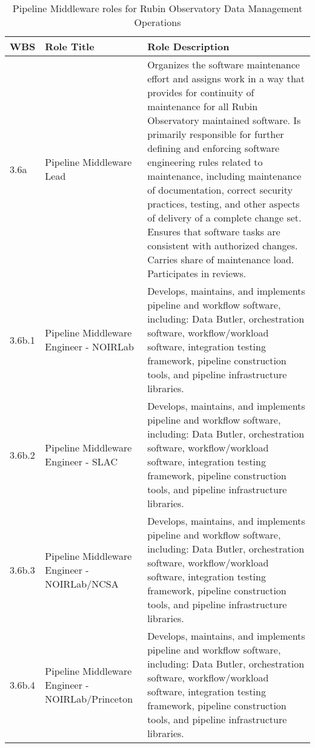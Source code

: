\normalsize \begin{longtable} {|p{}|p{}|p{}|} \caption{Pipeline Middleware roles for Rubin Observatory Data Management Operations \label{tab:pmwroles}}\\ 
\hline 
\textbf{WBS}&\textbf{Role Title}&\textbf{Role Description} \\ \hline
{3.6a}&{Pipeline Middleware Lead}&{Organizes the software maintenance effort and assigns work in a way that provides for continuity of maintenance for all Rubin Observatory maintained software. Is primarily responsible for further defining and enforcing software engineering rules related to maintenance, including maintenance of documentation, correct security practices, testing, and other aspects of delivery of a complete change set. Ensures that software tasks are consistent with authorized changes. Carries share of maintenance load. Participates in reviews.} \\ \hline
{3.6b.1}&{Pipeline Middleware Engineer - NOIRLab}&{Develops, maintains, and implements pipeline and workflow software, including: Data Butler, orchestration software, workflow/workload software, integration testing framework, pipeline construction tools, and pipeline infrastructure libraries.} \\ \hline
{3.6b.2}&{Pipeline Middleware Engineer - SLAC}&{Develops, maintains, and implements pipeline and workflow software, including: Data Butler, orchestration software, workflow/workload software, integration testing framework, pipeline construction tools, and pipeline infrastructure libraries.} \\ \hline
{3.6b.3}&{Pipeline Middleware Engineer - NOIRLab/NCSA}&{Develops, maintains, and implements pipeline and workflow software, including: Data Butler, orchestration software, workflow/workload software, integration testing framework, pipeline construction tools, and pipeline infrastructure libraries.} \\ \hline
{3.6b.4}&{Pipeline Middleware Engineer - NOIRLab/Princeton}&{Develops, maintains, and implements pipeline and workflow software, including: Data Butler, orchestration software, workflow/workload software, integration testing framework, pipeline construction tools, and pipeline infrastructure libraries.} \\ \hline
\end{longtable} \normalsize
